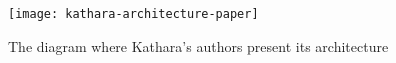 \begin{figure}
  \centering
  \texttt{[image: kathara-architecture-paper]}
  \caption{The diagram where Kathara's authors present its architecture}
  \label{fig:kathara-architecture-paper}
\end{figure}
